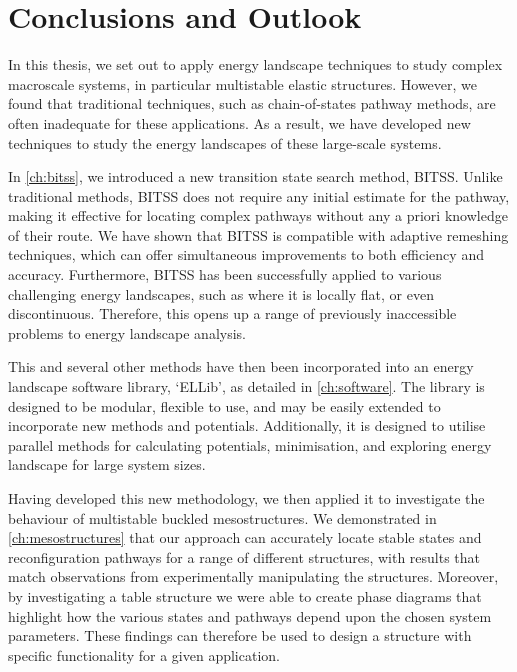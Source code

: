 \chapter{Conclusions and Outlook}
\label{ch:conclusion}
\graphicspath{{conclusion/fig/}}

In this thesis, we set out to apply energy landscape techniques to study complex macroscale systems, in particular multistable elastic structures. 
However, we found that traditional techniques, such as chain-of-states pathway methods, are often inadequate for these applications.
As a result, we have developed new techniques to study the energy landscapes of these large-scale systems.

In \cref{ch:bitss}, we introduced a new transition state search method, BITSS.
Unlike traditional methods, BITSS does not require any initial estimate for the pathway, making it effective for locating complex pathways without any a priori knowledge of their route.
We have shown that BITSS is compatible with adaptive remeshing techniques, which can offer simultaneous improvements to both efficiency and accuracy.
Furthermore, BITSS has been successfully applied to various challenging energy landscapes, such as where it is locally flat, or even discontinuous.
Therefore, this opens up a range of previously inaccessible problems to energy landscape analysis.

This and several other methods have then been incorporated into an energy landscape software library, `ELLib', as detailed in \cref{ch:software}.
The library is designed to be modular, flexible to use, and may be easily extended to incorporate new methods and potentials.
Additionally, it is designed to utilise parallel methods for calculating potentials, minimisation, and exploring energy landscape for large system sizes.


Having developed this new methodology, we then applied it to investigate the behaviour of multistable buckled mesostructures.
We demonstrated in \cref{ch:mesostructures} that our approach can accurately locate stable states and reconfiguration pathways for a range of different structures, with results that match observations from experimentally manipulating the structures.
Moreover, by investigating a table structure we were able to create phase diagrams that highlight how the various states and pathways depend upon the chosen system parameters.
These findings can therefore be used to design a structure with specific functionality for a given application.

